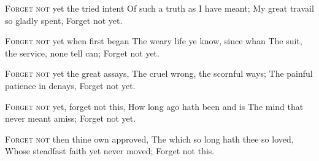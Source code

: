 \documentclass[fontsize=9, a5paper]{scrbook}
\newcommand\blankpage{%
    \null
    \thispagestyle{empty}%
    \addtocounter{page}{-1}%
    \newpage}
\begin{document}
\afterpage{\blankpage}
\begin{poem}
	\begin{stanza}
		\textsc{Forget not} yet the tried intent\verseline
		Of such a truth as I have meant;\verseline
		My great travail so gladly spent,\verseline
		            \verseindent\verseindent Forget not yet.
	\end{stanza}
	
	\begin{stanza}
		  \verseindent \textsc{Forget not} yet when first began\verseline
		The weary life ye know, since whan\verseline
		The suit, the service, none tell can;\verseline
		           \verseindent\verseindent Forget not yet.
	\end{stanza}
	
	\begin{stanza}
		  \verseindent \textsc{Forget not} yet the great assays,\verseline
		The cruel wrong, the scornful ways;\verseline
		The painful patience in denays,\verseline
		           \verseindent\verseindent Forget not yet.
	\end{stanza}
	
	\begin{stanza}
		  \verseindent \textsc{Forget not} yet, forget not this,\verseline
		How long ago hath been and is\verseline
		The mind that never meant amiss;\verseline
		           \verseindent\verseindent Forget not yet.
	\end{stanza}
	
	\begin{stanza}
		  \verseindent \textsc{Forget not} then thine own approved,\verseline
		The which so long hath thee so loved,\verseline
		Whose steadfast faith yet never moved;\verseline
		          \verseindent\verseindent  Forget not this.
	\end{stanza}
\end{poem}

\pagebreak
\end{document}
